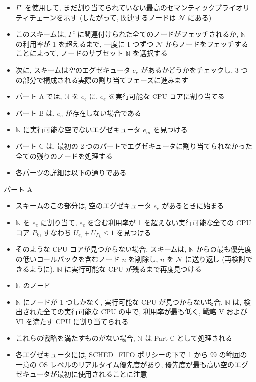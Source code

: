 \begin{frame}{}
    \begin{itemize}
        \item $\Gamma^{c}$ を使用して, まだ割り当てられていない最高のセマンティックプライオリティチェーンを示す (したがって, 関連するノードは $\mathcal{N}$ にある)
        \item このスキームは, $\Gamma^{c}$ に関連付けられた全てのノードがフェッチされるか, $\mathbb{N}$ の利用率が 1 を超えるまで, 一度に 1 つずつ $\mathcal{N}$ からノードをフェッチすることによって, ノードのサブセット $\mathbb{N}$ を選択する
        \item 次に, スキームは空のエグゼキュータ $e_{e}$ があるかどうかをチェックし, 3 つの部分で構成される実際の割り当てフェーズに進みます
        \item パート A では, $\mathbb{N}$ を $e_{e}$ に, $e_{e}$ を実行可能な CPU コアに割り当てる
        \item パート B は, $e_{e}$ が存在しない場合である
        \item $\mathbb{N}$ に実行可能な空でないエグゼキュータ $e_{m}$ を見つける
        \item パート $\mathrm{C}$ は, 最初の 2 つのパートでエグゼキュータに割り当てられなかった全ての残りのノードを処理する
        \item 各パーツの詳細は以下の通りである
    \end{itemize}
\end{frame}

\begin{frame}{パート A}
    \begin{itemize}
        \item スキームのこの部分は, 空のエグゼキュータ $e_{e}$ があるときに始まる
        \item $\mathbb{N}$ を $e_{e}$ に割り当て, $e_{e}$ を含む利用率が 1 を超えない実行可能な全ての CPU コア $P_{k}$, すなわち $U_{e_{e}}+U_{P_{k}} \leq 1$ を見つける
        \item そのような CPU コアが見つからない場合, スキームは, $\mathbb{N}$ からの最も優先度の低いコールバックを含むノード $n$ を削除し, $n$ を $\mathcal{N}$ に送り返し (再検討できるように), $\mathbb{N}$ に実行可能な CPU が残るまで再度見つける
        \item $\mathbb{N}$ のノード
        \item $\mathbb{N}$ にノードが 1 つしかなく, 実行可能な CPU が見つからない場合, $\mathbb{N}$ は, 検出された全ての実行可能な CPU の中で, 利用率が最も低く, 戦略 V および VI を満たす CPU に割り当てられる
        \item これらの戦略を満たすものがない場合, $\mathbb{N}$ は Part $\mathrm{C}$ として処理される
        \item 各エグゼキュータには, SCHED\_FIFO ポリシーの下で 1 から 99 の範囲の一意の OS レベルのリアルタイム優先度があり, 優先度が最も高い空のエグゼキュータが最初に使用されることに注意
    \end{itemize}
\end{frame}

